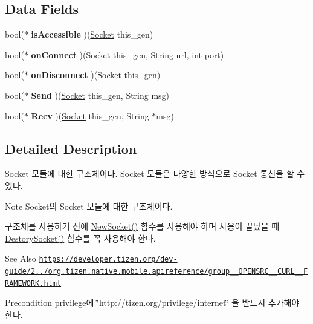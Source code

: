 \subsection*{Data Fields}
\begin{DoxyCompactItemize}
\item 
\hypertarget{struct__Socket_ac1ad80a37ffe5c487d7951ba7bb3f825}{bool($\ast$ {\bfseries is\-Accessible} )(\hyperlink{struct__Socket}{Socket} this\-\_\-gen)}\label{struct__Socket_ac1ad80a37ffe5c487d7951ba7bb3f825}

\item 
\hypertarget{struct__Socket_a12fc7a8a0e3742d18dec08defeb67435}{bool($\ast$ {\bfseries on\-Connect} )(\hyperlink{struct__Socket}{Socket} this\-\_\-gen, String url, int port)}\label{struct__Socket_a12fc7a8a0e3742d18dec08defeb67435}

\item 
\hypertarget{struct__Socket_ad7a809e33935ee525606738714730f7a}{bool($\ast$ {\bfseries on\-Disconnect} )(\hyperlink{struct__Socket}{Socket} this\-\_\-gen)}\label{struct__Socket_ad7a809e33935ee525606738714730f7a}

\item 
\hypertarget{struct__Socket_a0d82d1d1d78c09f2fa3a3e5709527ae5}{bool($\ast$ {\bfseries Send} )(\hyperlink{struct__Socket}{Socket} this\-\_\-gen, String msg)}\label{struct__Socket_a0d82d1d1d78c09f2fa3a3e5709527ae5}

\item 
\hypertarget{struct__Socket_aac90f466e6ccbe0f89754c4185c54302}{bool($\ast$ {\bfseries Recv} )(\hyperlink{struct__Socket}{Socket} this\-\_\-gen, String $\ast$msg)}\label{struct__Socket_aac90f466e6ccbe0f89754c4185c54302}

\end{DoxyCompactItemize}


\subsection{Detailed Description}
Socket 모듈에 대한 구조체이다. Socket 모듈은 다양한 방식으로 Socket 통신을 할 수 있다. 

\begin{DoxyNote}{Note}
Socket의 Socket 모듈에 대한 구조체이다. \par
 구조체를 사용하기 전에 \hyperlink{Socket_8h_a1e1d2bbe80adb61014a4a67b3b507aae}{New\-Socket()} 함수를 사용해야 하며 사용이 끝났을 때 \hyperlink{Socket_8h_a72ff91c23eed60f629fbae39dbce94e2}{Destory\-Socket()} 함수를 꼭 사용해야 한다. 
\end{DoxyNote}
\begin{DoxySeeAlso}{See Also}
\href{https://developer.tizen.org/dev-guide/2.3.0/org.tizen.native.mobile.apireference/group__OPENSRC__CURL__FRAMEWORK.html}{\tt https\-://developer.\-tizen.\-org/dev-\/guide/2../org.\-tizen.\-native.\-mobile.\-apireference/group\-\_\-\-\_\-\-O\-P\-E\-N\-S\-R\-C\-\_\-\-\_\-\-C\-U\-R\-L\-\_\-\-\_\-\-F\-R\-A\-M\-E\-W\-O\-R\-K.\-html} 
\end{DoxySeeAlso}
\begin{DoxyPrecond}{Precondition}
privilege에 \char`\"{}http\-://tizen.\-org/privilege/internet\char`\"{} 을 반드시 추가해야 한다. 
\end{DoxyPrecond}


